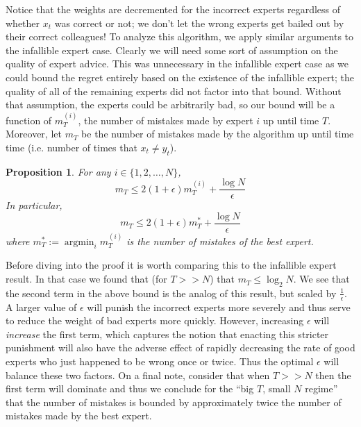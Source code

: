 \documentclass[12pt]{article}
\DeclareMathOperator*{\argmin}{argmin}
\newtheorem{prop}{Proposition}
\begin{document}
\bigskip

Notice that the weights are decremented for the incorrect experts regardless of whether $x_t$ was correct or not; we don't let the wrong experts get bailed out by their correct colleagues!
To analyze this algorithm, we apply similar arguments to the infallible expert case. Clearly we will need some sort of assumption on the quality of expert advice. This was unnecessary in the infallible expert
case as we could bound the regret entirely based on the existence of the infallible expert; the quality of all of the remaining experts did not factor into that bound. Without that assumption, the experts could 
be arbitrarily bad, so our bound will be a function of $m_T^{(i)}$, the number of mistakes made by expert $i$ up until time $T$. Moreover, let $m_T$ be the number of mistakes made by the algorithm up until
time time (i.e. number of times that $x_t \neq y_t$). 

\begin{prop}
For any $i \in \{1, 2, \dots, N\}$, 
\[m_T \leq 2(1 + \epsilon)m_T^{(i)} + \frac{\log N}{\epsilon}\]
In particular, 
\[m_T \leq 2(1 + \epsilon)m_T^{*} + \frac{\log N}{\epsilon}\]
where $m_T^{*} := \argmin_{i} m_T^{(i)}$ is the number of mistakes of the best expert. 
\end{prop}
Before diving into the proof it is worth comparing this to the infallible expert result. In that case we found that (for $T >> N$) that $m_T \leq \log_2 N$. We see that the second term in the above 
bound is the analog of this result, but scaled by $\frac{1}{\epsilon}$. A larger value of $\epsilon$ will punish the incorrect experts more severely and thus serve to reduce the weight of bad experts
more quickly. However, increasing $\epsilon$ will \textit{increase} the first term, which captures the notion that enacting this stricter punishment will also have the adverse effect of rapidly decreasing the 
rate of good experts who just happened to be wrong once or twice. Thus the optimal $\epsilon$ will balance these two factors. On a final note, consider that when $T >> N$ then the first term will 
dominate and thus we conclude for the ``big $T$, small $N$ regime'' that the number of mistakes is bounded by approximately twice the number of mistakes made by the best expert. 
\end{document}
